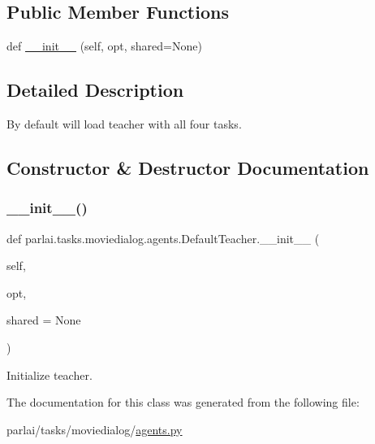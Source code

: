 \subsection*{Public Member Functions}
\begin{DoxyCompactItemize}
\item 
def \hyperlink{classparlai_1_1tasks_1_1moviedialog_1_1agents_1_1DefaultTeacher_a80e2f5fa10d6a6d884fca5ca97fe2e29}{\+\_\+\+\_\+init\+\_\+\+\_\+} (self, opt, shared=None)
\end{DoxyCompactItemize}


\subsection{Detailed Description}
\begin{DoxyVerb}By default will load teacher with all four tasks.
\end{DoxyVerb}
 

\subsection{Constructor \& Destructor Documentation}
\mbox{\label{classparlai_1_1tasks_1_1moviedialog_1_1agents_1_1DefaultTeacher_a80e2f5fa10d6a6d884fca5ca97fe2e29}} 
\subsubsection{\texorpdfstring{\+\_\+\+\_\+init\+\_\+\+\_\+()}{\_\_init\_\_()}}
{\footnotesize\ttfamily def parlai.\+tasks.\+moviedialog.\+agents.\+Default\+Teacher.\+\_\+\+\_\+init\+\_\+\+\_\+ (\begin{DoxyParamCaption}\item[{}]{self,  }\item[{}]{opt,  }\item[{}]{shared = {\ttfamily None} }\end{DoxyParamCaption})}

\begin{DoxyVerb}Initialize teacher.
\end{DoxyVerb}
 

The documentation for this class was generated from the following file\+:\begin{DoxyCompactItemize}
\item 
parlai/tasks/moviedialog/\hyperlink{parlai_2tasks_2moviedialog_2agents_8py}{agents.\+py}\end{DoxyCompactItemize}
